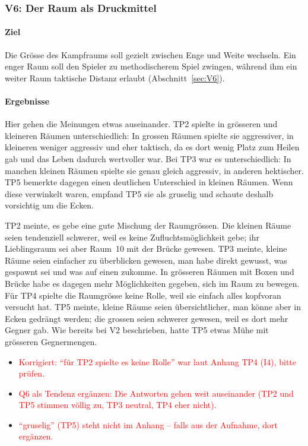 \documentclass[../Main.tex]{subfiles}
\begin{document}
\subsubsection{V6: Der Raum als Druckmittel}

\paragraph{Ziel}
Die Grösse des Kampfraums soll gezielt zwischen Enge und Weite wechseln. Ein enger Raum soll den Spieler zu methodischerem Spiel zwingen, während ihm ein weiter Raum taktische Distanz erlaubt (Abschnitt~\ref{sec:V6}).

\paragraph{Ergebnisse}
Hier gehen die Meinungen etwas auseinander. TP2 spielte in grösseren und kleineren Räumen unterschiedlich: In grossen Räumen spielte sie aggressiver, in kleineren weniger aggressiv und eher taktisch, da es dort wenig Platz zum Heilen gab und das Leben dadurch wertvoller war. Bei TP3 war es unterschiedlich: In manchen kleinen Räumen spielte sie genau gleich aggressiv, in anderen hektischer. TP5 bemerkte dagegen einen deutlichen Unterschied in kleinen Räumen. Wenn diese verwinkelt waren, empfand TP5 sie als gruselig und schaute deshalb vorsichtig um die Ecken.

TP2 meinte, es gebe eine gute Mischung der Raumgrössen. Die kleinen Räume seien tendenziell schwerer, weil es keine Zufluchtsmöglichkeit gebe; ihr Lieblingsraum sei aber Raum~10 mit der Brücke gewesen. TP3 meinte, kleine Räume seien einfacher zu überblicken gewesen, man habe direkt gewusst, was gespawnt sei und was auf einen zukomme. In grösseren Räumen mit Boxen und Brücke habe es dagegen mehr Möglichkeiten gegeben, sich im Raum zu bewegen. Für TP4 spielte die Raumgrösse keine Rolle, weil sie einfach alles kopfvoran versucht hat. TP5 meinte, kleine Räume seien übersichtlicher, man könne aber in Ecken gedrängt werden; die grossen seien schwerer gewesen, weil es dort mehr Gegner gab. Wie bereits bei V2 beschrieben, hatte TP5 etwas Mühe mit grösseren Gegnermengen.

\begin{itemize}[leftmargin=1.5cm]
    \item \textcolor{red}{Korrigiert: \enquote{für TP2 spielte es keine Rolle} war laut Anhang TP4 (I4), bitte prüfen.}
    \item \textcolor{red}{Q6 als Tendenz ergänzen: Die Antworten gehen weit auseinander (TP2 und TP5 stimmen völlig zu, TP3 neutral, TP4 eher nicht).}
    \item \textcolor{red}{\enquote{gruselig} (TP5) steht nicht im Anhang -- falls aus der Aufnahme, dort ergänzen.}
\end{itemize}
\end{document}
